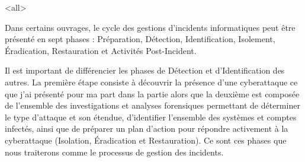 \mode<all>{}


Dans certains ouvrages, le cycle des gestions d’incidents informatiques  peut être  présenté  en sept phases : Préparation, Détection, Identification, Isolement, Éradication, Restauration et Activités Post-Incident. 

Il est important de différencier les phases de Détection et d’Identification des autres.  La première étape consiste à découvrir la présence d’une cyberattaque ce que j'ai présenté pour ma part dans la partie   alors que la deuxième est composée de l’ensemble des investigations et analyses forensiques permettant de déterminer le type d’attaque et son étendue, d’identifier l’ensemble des systèmes et comptes infectés, ainsi que de préparer un plan d’action pour répondre activement à la cyberattaque (Isolation, Éradication et Restauration). Ce sont ces phases que nous traiterons comme le processus de gestion des incidents.








